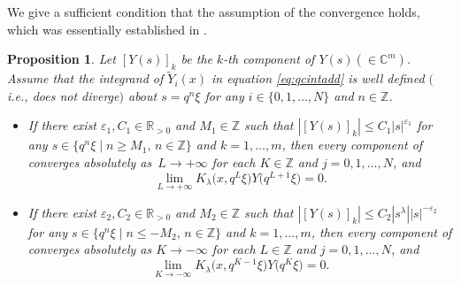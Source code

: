 \documentclass[pdftex]{sigma}
\numberwithin{equation}{section}
\newtheorem{Proposition}[Theorem]{Proposition}
\theoremstyle{definition}
\begin{document}
We give a sufficient condition that the assumption of the convergence holds, which was essentially established in \cite[Proposition 2.5]{AT}.
\begin{Proposition} \label{prop:qcintconv}
Let $[Y(s )]_k $ be the $k$-th component of $Y(s ) (\in \mathbb{C}^{m} )$.
Assume that the integrand of $\widetilde{Y}_{i} (x) $ in equation \eqref{eq:qcintadd} is well defined $($i.e., does not diverge$)$ about $s= q^n \xi $ for any $i \in \{ 0 , 1, \dots , N \}$ and $n \in \mathbb{Z} $.
\begin{itemize}\itemsep=0pt
\item[$(i)$] If there exist $\varepsilon _1 , C_1 \in \mathbb{R} _{>0} $ and $M_1 \in \mathbb{Z} $ such that $|[Y(s )]_k | \leq C_1 |s |^{\varepsilon _1} $ for any $s \in \{ q^{n}\xi \mid n \geq M_1 ,\, n \in \mathbb{Z} \} $ and $k=1,\dots ,m$, then every component of  converges absolutely as~${L \to +\infty }$ for each $K \in \mathbb{Z} $ and $j=0,1,\dots ,N$, and
\begin{equation}
\lim _{L \to +\infty } K_{\lambda}\bigl(x, q^{L} \xi\bigr)Y\bigl(q^{L+1} \xi\bigr) =0.
\label{eq:limL}
\end{equation}
\item[$(ii)$] If there exist $\varepsilon _2 , C_2 \in \mathbb{R} _{>0} $ and $M_2 \in \mathbb{Z} $ such that $|[Y(s )]_k | \leq C_2 |s ^{\lambda }| |s | ^{ - \varepsilon _2}$ for any $s \in \{ q^{n}\xi \mid n \leq - M_2 ,\, n \in \mathbb{Z} \} $ and $k=1,\dots ,m$, then every component of  converges absolutely as $K \to -\infty $ for each $L \in \mathbb{Z} $ and $j=0,1,\dots ,N$, and
\begin{equation}
\lim _{K \to -\infty} K_{\lambda}\bigl(x, q^{K-1} \xi\bigr)Y\bigl(q^{K} \xi\bigr) =0.
\label{eq:limK}
\end{equation}
\end{itemize}
\end{Proposition}
\end{document}
